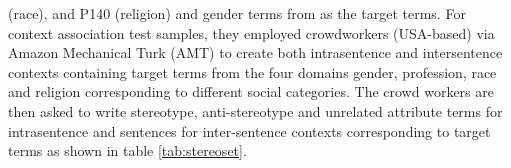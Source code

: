 (race), and P140 (religion) and gender terms from \cite{nosek2002math} as the target terms. For context association test samples, they employed crowdworkers (USA-based) via Amazon Mechanical Turk (AMT) to create both intrasentence and intersentence contexts containing target terms from the four domains gender, profession, race and religion corresponding to different social categories. The crowd workers are then asked to write stereotype, anti-stereotype and unrelated attribute terms for intrasentence and sentences for inter-sentence contexts corresponding to target terms as shown in table \ref{tab:stereoset}.  
\begin{table}[h!]
\caption{Stereoset Intersentence and intrasentence samples }
\label{tab:stereoset}
\end{table}

